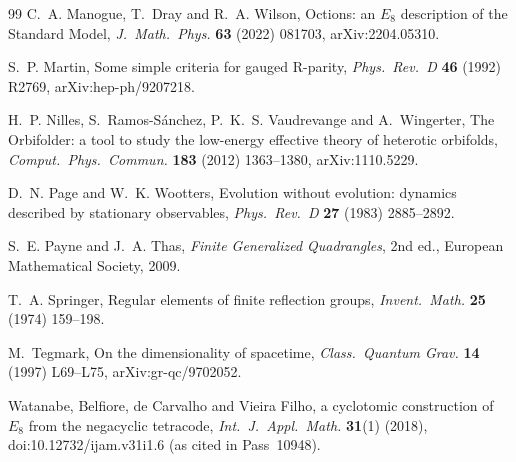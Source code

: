 \begin{thebibliography}{99}
 C.~A. Manogue, T.~Dray and R.~A. Wilson, Octions: an $E_8$ description of
the Standard Model, \emph{J.\ Math.\ Phys.} \textbf{63} (2022) 081703, arXiv:2204.05310.

 S.~P. Martin, Some simple criteria for gauged R-parity, \emph{Phys.\
Rev.\ D} \textbf{46} (1992) R2769, arXiv:hep-ph/9207218.

 H.~P. Nilles, S.~Ramos-S\'anchez, P.~K.~S. Vaudrevange and
A.~Wingerter, The Orbifolder: a tool to study the low-energy effective theory of heterotic
orbifolds, \emph{Comput.\ Phys.\ Commun.} \textbf{183} (2012) 1363--1380, arXiv:1110.5229.

 D.~N. Page and W.~K. Wootters, Evolution without evolution: dynamics
described by stationary observables, \emph{Phys.\ Rev.\ D} \textbf{27} (1983) 2885--2892.

 S.~E. Payne and J.~A. Thas, \emph{Finite Generalized Quadrangles}, 2nd
ed., European Mathematical Society, 2009.

 T.~A. Springer, Regular elements of finite reflection groups,
\emph{Invent.\ Math.} \textbf{25} (1974) 159--198.

 M.~Tegmark, On the dimensionality of spacetime, \emph{Class.\ Quantum
Grav.} \textbf{14} (1997) L69--L75, arXiv:gr-qc/9702052.

 Watanabe, Belfiore, de Carvalho and Vieira Filho, a cyclotomic
construction of $E_8$ from the negacyclic tetracode, \emph{Int.\ J.\ Appl.\ Math.}
\textbf{31}(1) (2018), doi:10.12732/ijam.v31i1.6 (as cited in Pass~10948).

\end{thebibliography}

